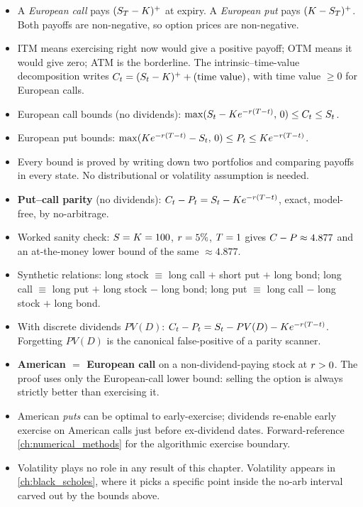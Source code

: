 \begin{itemize}
  \item A \emph{European call} pays $(S_T - K)^+$ at
  expiry. A \emph{European put} pays $(K - S_T)^+$.
  Both payoffs are non-negative, so option prices are
  non-negative.
  \item ITM means exercising right now would give a positive
  payoff; OTM means it would give zero; ATM is the borderline.
  The intrinsic--time-value decomposition writes
  $C_t = (S_t - K)^+ + (\text{time value})$, with
  time value $\geq 0$ for European calls.
  \item European call bounds (no dividends):
  $\max(S_t - K e^{-r(T-t)},\, 0) \leq C_t
  \leq S_t$.
  \item European put bounds:
  $\max(K e^{-r(T-t)} - S_t,\, 0) \leq P_t
  \leq K e^{-r(T-t)}$.
  \item Every bound is proved by writing down two portfolios and
  comparing payoffs in every state. No distributional or
  volatility assumption is needed.
  \item \textbf{Put--call parity} (no dividends):
  $C_t - P_t = S_t - K e^{-r(T-t)}$,
  exact, model-free, by no-arbitrage.
  \item Worked sanity check: $S = K = 100$,
  $r = 5\%$, $T = 1$ gives $C - P \approx 4.877$
  and an at-the-money lower bound of the same $\approx 4.877$.
  \item Synthetic relations: long stock $\equiv$ long call $+$
  short put $+$ long bond; long call $\equiv$ long put $+$
  long stock $-$ long bond; long put $\equiv$ long call $-$
  long stock $+$ long bond.
  \item With discrete dividends $PV(D)$:
  $C_t - P_t = S_t - PV(D) - K e^{-r(T-t)}$.
  Forgetting $PV(D)$ is the canonical false-positive of a
  parity scanner.
  \item \textbf{American $=$ European call} on a
  non-dividend-paying stock at $r > 0$. The proof uses only
  the European-call lower bound: selling the option is always
  strictly better than exercising it.
  \item American \emph{puts} can be optimal to early-exercise;
  dividends re-enable early exercise on American calls just
  before ex-dividend dates. Forward-reference
  \cref{ch:numerical_methods} for the algorithmic exercise
  boundary.
  \item Volatility plays no role in any result of this chapter.
  Volatility appears in \cref{ch:black_scholes}, where it picks
  a specific point inside the no-arb interval carved out by the
  bounds above.
\end{itemize}
